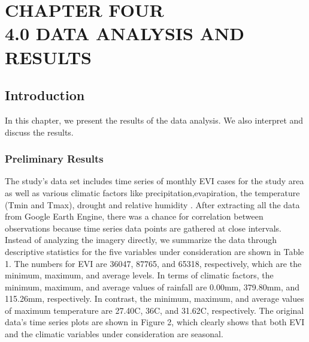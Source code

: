 
\chapter{CHAPTER FOUR\\4.0 DATA ANALYSIS AND RESULTS} %
\section{Introduction}
In this chapter, we present the results of the data analysis. We also interpret and discuss the results. 

\subsection{Preliminary Results}
The study's data set includes time series of monthly EVI cases for the study area as well as various climatic factors like precipitation,evapiration, the temperature (Tmin and Tmax), drought and relative humidity . After extracting all the data from  Google Earth Engine, there was a chance for correlation between observations because time series data points are gathered at close intervals. Instead of analyzing the imagery directly, we  summarize the data through descriptive statistics for the five variables under consideration are shown in Table 1. The numbers for EVI are 36047, 87765, and 65318, respectively, which are the minimum, maximum, and average levels. In terms of climatic factors, the minimum, maximum, and average values of rainfall are 0.00mm, 379.80mm, and 115.26mm, respectively. In contrast, the minimum, maximum, and average values of maximum temperature are 27.40C, 36C, and 31.62C, respectively. The original data's time series plots are shown in Figure 2, which clearly shows that both EVI and the climatic variables under consideration are seasonal. 


